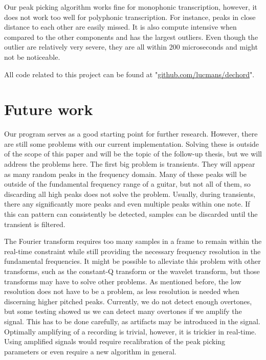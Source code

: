\documentclass[10pt,twocolumn]{article}
\begin{document}
Our peak picking algorithm works fine for monophonic transcription, however, it does not work too well for polyphonic transcription. For instance, peaks in close distance to each other are easily missed. It is also compute intensive when compared to the other components and has the largest outliers. Even though the outlier are relatively very severe, they are all within 200 microseconds and might not be noticeable.

All code related to this project can be found at "\url{github.com/lucmans/dechord}".


\section{Future work}  \label{sec:future}
Our program serves as a good starting point for further research. However, there are still some problems with our current implementation. Solving these is outside of the scope of this paper and will be the topic of the follow-up thesis, but we will address the problems here. The first big problem is transients. They will appear as many random peaks in the frequency domain. Many of these peaks will be outside of the fundamental frequency range of a guitar, but not all of them, so discarding all high peaks does not solve the problem. Usually, during transients, there any significantly more peaks and even multiple peaks within one note. If this can pattern can consistently be detected, samples can be discarded until the transient is filtered.

The Fourier transform requires too many samples in a frame to remain within the real-time constraint while still providing the necessary frequency resolution in the fundamental frequencies. It might be possible to alleviate this problem with other transforms, such as the constant-Q transform or the wavelet transform, but those transforms may have to solve other problems. As mentioned before, the low resolution does not have to be a problem, as less resolution is needed when discerning higher pitched peaks. Currently, we do not detect enough overtones, but some testing showed us we can detect many overtones if we amplify the signal. This has to be done carefully, as artifacts may be introduced in the signal. Optimally amplifying of a recording is trivial, however, it is trickier in real-time. Using amplified signals would require recalibration of the peak picking parameters or even require a new algorithm in general.
\end{document}
